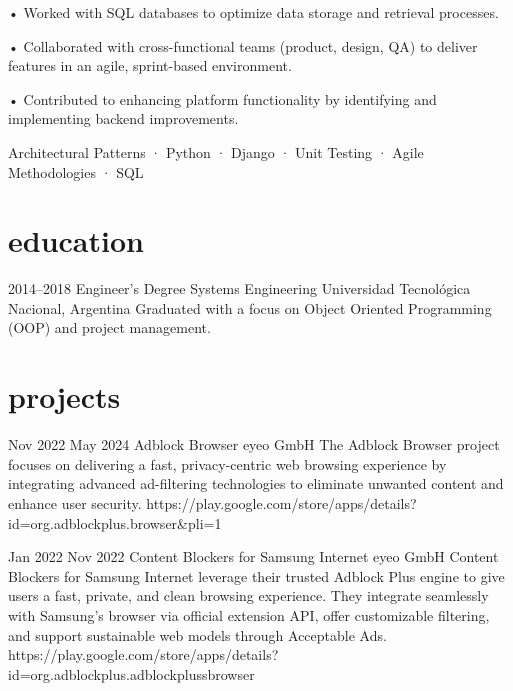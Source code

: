 \documentclass[a4paper,nocolors]{friggeri-cv}
\begin{document}
\begin{entrylist}
{  • Worked with SQL databases to optimize data storage and retrieval processes.

  • Collaborated with cross-functional teams (product, design, QA) to deliver features in an agile, sprint-based environment.

  • Contributed to enhancing platform functionality by identifying and implementing backend improvements.
}
{
  Architectural Patterns · Python · Django · Unit Testing · Agile Methodologies · SQL
}


\end{entrylist}


\section{education}

\begin{entrylist}


\entry
{2014--2018}
{Engineer’s Degree {\normalfont Systems Engineering}}
{Universidad Tecnológica Nacional, Argentina}
{Graduated with a focus on Object Oriented Programming (OOP) and project management.}

\end{entrylist}


\section{projects}
\begin{entrylist}
\entryproject
{Nov 2022}
{May 2024}
{Adblock Browser}
{eyeo GmbH}
{
  The Adblock Browser project focuses on delivering a fast, privacy-centric web
  browsing experience by integrating advanced ad-filtering technologies to eliminate
  unwanted content and enhance user security.
}
{https://play.google.com/store/apps/details?id=org.adblockplus.browser&pli=1}

\entryproject
{Jan 2022}
{Nov 2022}
{Content Blockers for Samsung Internet}
{eyeo GmbH}
{
  Content Blockers for Samsung Internet leverage their trusted Adblock Plus engine to give users a fast, private, and clean browsing experience. They integrate seamlessly with Samsung’s browser via official extension API, offer customizable filtering, and support sustainable web models through Acceptable Ads.
}
{https://play.google.com/store/apps/details?id=org.adblockplus.adblockplussbrowser}

\end{entrylist} 
\end{document}

